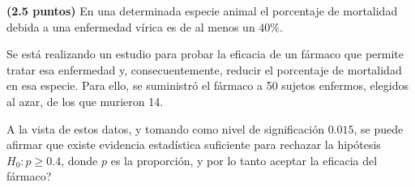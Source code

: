 
\textbf{(2.5 puntos)} En una determinada especie animal el porcentaje de mortalidad debida a una enfermedad vírica es de al menos un $40\%$.

Se está realizando un estudio para probar la eficacia de un fármaco que permite tratar esa enfermedad y, consecuentemente, reducir el porcentaje de mortalidad en esa especie. Para ello, se suministró el fármaco a 50 sujetos enfermos, elegidos al azar, de los que murieron 14.

A la vista de estos datos, y tomando como nivel de significación $0.015$, \textquestiondown{}se puede afirmar que existe evidencia estadística suficiente para rechazar la hipótesis $H_0:p\geq0.4$, donde $p$ es la proporción, y por lo tanto aceptar la eficacia del fármaco?
